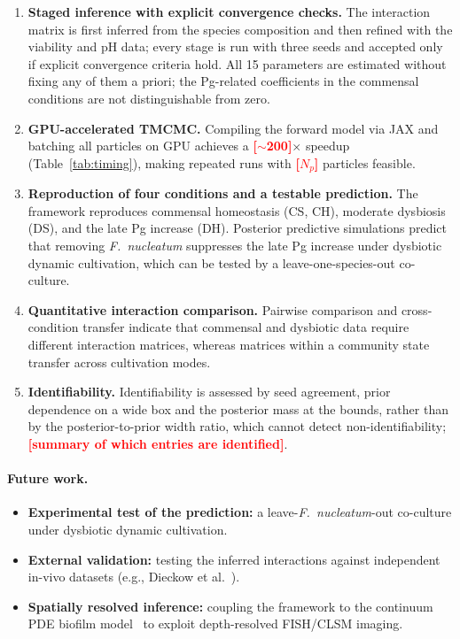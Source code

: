 \documentclass[pdflatex,sn-mathphys-num,lineno]{sn-jnl}
\newcommand{\TBD}[1]{\textcolor{red}{\textbf{[#1]}}}
\begin{document}
\begin{enumerate}[nosep,leftmargin=*]
\item \textbf{Staged inference with explicit convergence checks.}
The interaction matrix is first inferred from the species composition and then refined with the viability and pH data; every stage is run with three seeds and accepted only if explicit convergence criteria hold.
All 15 parameters are estimated without fixing any of them a priori; the Pg-related coefficients in the commensal conditions are not distinguishable from zero.

\item \textbf{GPU-accelerated TMCMC.}
Compiling the forward model via JAX and batching all particles on GPU achieves a \TBD{$\sim$200}$\times$ speedup (Table~\ref{tab:timing}), making repeated runs with \TBD{$N_p$} particles feasible.

\item \textbf{Reproduction of four conditions and a testable prediction.}
The framework reproduces commensal homeostasis (CS, CH), moderate dysbiosis (DS), and the late Pg increase (DH).
Posterior predictive simulations predict that removing \textit{F.~nucleatum} suppresses the late Pg increase under dysbiotic dynamic cultivation, which can be tested by a leave-one-species-out co-culture.

\item \textbf{Quantitative interaction comparison.}
Pairwise comparison and cross-condition transfer indicate that commensal and dysbiotic data require different interaction matrices, whereas matrices within a community state transfer across cultivation modes.

\item \textbf{Identifiability.}
Identifiability is assessed by seed agreement, prior dependence on a wide box and the posterior mass at the bounds, rather than by the posterior-to-prior width ratio, which cannot detect non-identifiability; \TBD{summary of which entries are identified}.
\end{enumerate}

\paragraph{Future work.}
\begin{itemize}[nosep,leftmargin=*]
    \item \textbf{Experimental test of the prediction:} a leave-\textit{F.~nucleatum}-out co-culture under dysbiotic dynamic cultivation.
    \item \textbf{External validation:} testing the inferred interactions against independent in-vivo datasets (e.g., Dieckow et al.~\cite{dieckow2024structure}).
    \item \textbf{Spatially resolved inference:} coupling the framework to the continuum PDE biofilm model~\cite{Klempt2025ContinuumBiofilm} to exploit depth-resolved FISH/CLSM imaging.
\end{itemize}
\end{document}
